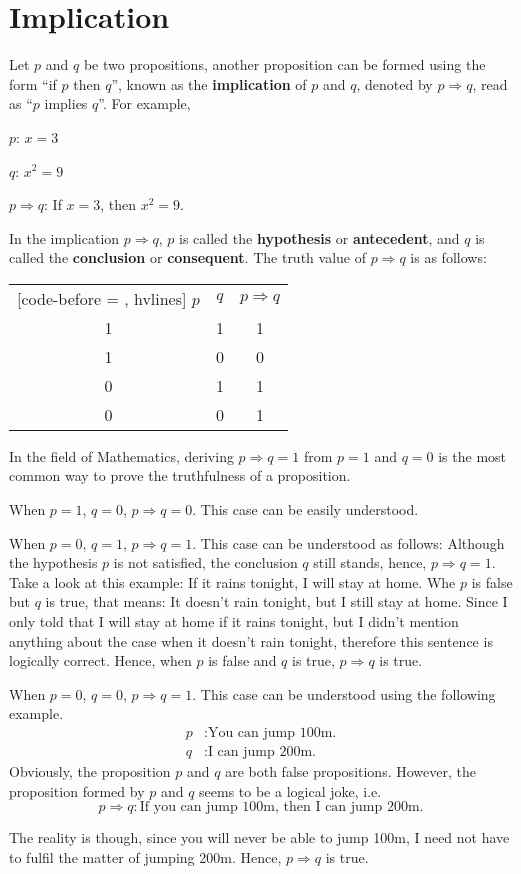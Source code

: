 \documentclass{report}
\begin{document}
\section{Implication}

Let $p$ and $q$ be two propositions, another proposition can be formed using
the form ``if $p$ then $q$'', known as the \textbf{implication} of $p$ and $q$,
denoted by $p \Rightarrow q$, read as ``$p$ implies $q$''. For example,

$p$: $x = 3$

$q$: $x^2 = 9$

$p \Rightarrow q$: If $x = 3$, then $x^2 = 9$.

\noindent In the implication $p \Rightarrow q$, $p$ is called the \textbf{hypothesis} or
\textbf{antecedent}, and $q$ is called the \textbf{conclusion} or
\textbf{consequent}. The truth value of $p \Rightarrow q$ is as follows:
\begin{center}
    \begin{NiceTabular}{|c|c|c|}[code-before = , hvlines]
        $p$ & $q$ & $p \Rightarrow q$ \\
        1   & 1   & 1                 \\
        1   & 0   & 0                 \\
        0   & 1   & 1                 \\
        0   & 0   & 1                 \\
    \end{NiceTabular}
\end{center}

In the field of Mathematics, deriving $p \Rightarrow q = 1$ from $p = 1$ and $q
    = 0$ is the most common way to prove the truthfulness of a proposition.

When $p = 1$, $q = 0$, $p \Rightarrow q = 0$. This case can be easily
understood.

When $p = 0$, $q = 1$, $p \Rightarrow q = 1$. This case can be understood as
follows: Although the hypothesis $p$ is not satisfied, the conclusion $q$ still
stands, hence, $p \Rightarrow q = 1$. Take a look at this example: If it rains
tonight, I will stay at home. Whe $p$ is false but $q$ is true, that means: It
doesn't rain tonight, but I still stay at home. Since I only told that I will
stay at home if it rains tonight, but I didn't mention anything about the case
when it doesn't rain tonight, therefore this sentence is logically correct.
Hence, when $p$ is false and $q$ is true, $p \Rightarrow q$ is true.

When $p = 0$, $q = 0$, $p \Rightarrow q = 1$. This case can be understood using
the following example.
\begin{align*}
    p & : \text{You can jump 100m.} \\
    q & : \text{I can jump 200m.}
\end{align*}
Obviously, the proposition $p$ and $q$ are both false propositions. However, the proposition formed by $p$ and $q$ seems to be a logical joke, i.e.
\[p \Rightarrow q : \text{If you can jump 100m, then I can jump 200m.}\]

The reality is though, since you will never be able to jump 100m, I need not
have to fulfil the matter of jumping 200m. Hence, $p \Rightarrow q$ is true.
\end{document}
